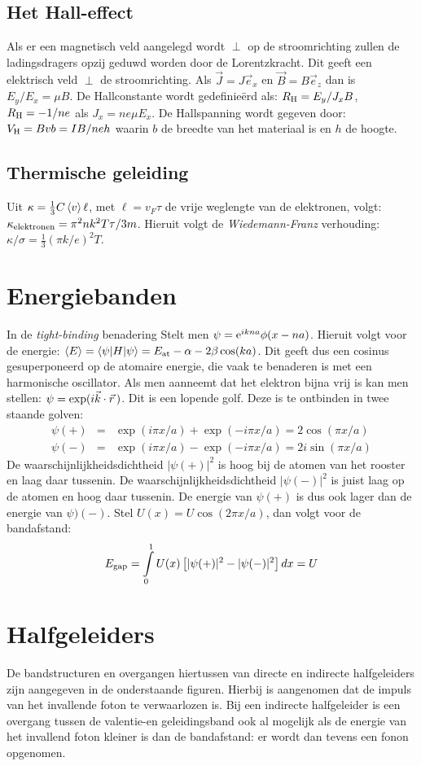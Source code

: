 \documentclass[twoside]{report}
\begin{document}
\subsection{Het Hall-effect}
Als er een magnetisch veld aangelegd wordt $\perp$ op de stroomrichting
zullen de ladingsdragers opzij geduwd worden door de Lorentzkracht. Dit geeft
een elektrisch veld $\perp$ de stroomrichting. Als $\vec{J}=J\vec{e}_x$ en
$\vec{B}=B\vec{e}_z$ dan is $E_y/E_x=\mu B$. De Hallconstante wordt
gedefinie\"erd als: $R_{\rm H}=E_y/J_x B$, $R_{\rm H}=-1/ne$ als
$J_x=ne\mu E_x$. De Hallspanning wordt gegeven door: $V_{\rm H}=Bvb=IB/neh$
waarin $b$ de breedte van het materiaal is en $h$ de hoogte.

\subsection{Thermische geleiding}
Uit $\kappa=\frac{1}{3}C\left\langle v \right\rangle\ell$, met $\ell =v_F\tau$ de vrije weglengte
van de elektronen, volgt: $\kappa_{\rm elektronen}=\pi^2nk^2T\tau/3m$.
Hieruit volgt de {\it Wiedemann-Franz} verhouding:
$\kappa/\sigma=\frac{1}{3}(\pi k/e)^2T$.

\section{Energiebanden}
In de {\it tight-binding} benadering Stelt men
$\psi={\rm e}^{ikna}\phi(x-na)$. Hieruit volgt voor de energie:
$\left\langle E \right\rangle=\left\langle \psi|H|\psi \right\rangle=E_{\rm at}-\alpha-2\beta\cos(ka)$.
Dit geeft dus een cosinus gesuperponeerd op de atomaire energie, die vaak te
benaderen is met een harmonische oscillator. Als men aanneemt dat het elektron
bijna vrij is kan men stellen: $\psi=\exp(i\vec{k}\cdot\vec{r}\,)$. Dit is
een lopende golf. Deze is te ontbinden in twee staande golven:
\begin{eqnarray*}
\psi(+)&=&\exp(i\pi x/a)+\exp(-i\pi x/a)=2\cos(\pi x/a)\\
\psi(-)&=&\exp(i\pi x/a)-\exp(-i\pi x/a)=2i\sin(\pi x/a)
\end{eqnarray*}
De waarschijnlijkheidsdichtheid $|\psi(+)|^2$ is hoog bij de
atomen van het rooster en laag daar tussenin. De waarschijnlijkheidsdichtheid
$|\psi(-)|^2$ is juist laag op de atomen en hoog daar tussenin. De energie
van $\psi(+)$ is dus ook lager dan de energie van $\psi)(-)$. Stel
$U(x)=U\cos(2\pi x/a)$, dan volgt voor de bandafstand:
\[
E_{\rm gap}=\int\limits_0^1 U(x)\left[ |\psi(+)|^2-|\psi(-)|^2\right] dx=U
\]

\section{Halfgeleiders}
De bandstructuren en overgangen hiertussen van directe en indirecte
halfgeleiders zijn aangegeven in de onderstaande figuren. Hierbij is
aangenomen dat de impuls van het invallende foton te verwaarlozen is. Bij een
indirecte halfgeleider is een overgang tussen de valentie-en geleidingsband
ook al mogelijk als de energie van het invallend foton kleiner is dan de
bandafstand: er wordt dan tevens een fonon opgenomen.
\end{document}
